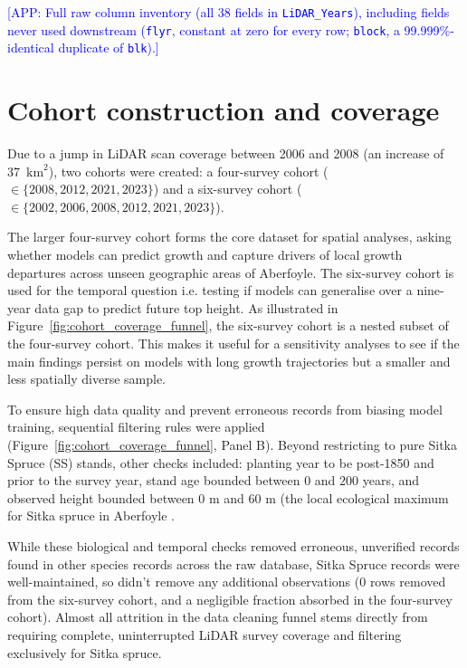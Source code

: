 \documentclass[11pt,a4paper]{report}
\newcommand{\app}[1]{\textcolor{blue}{[APP: #1]}}
\begin{document}
\app{Full raw column inventory (all 38 fields in \texttt{LiDAR\_Years}), including fields never
used downstream (\texttt{flyr}, constant at zero for every row; \texttt{block}, a
99.999\%-identical duplicate of \texttt{blk}).}


\section{Cohort construction and coverage}
\label{sec:data-cohorts}

Due to a jump in LiDAR scan coverage between 2006 and 2008 (an increase of 37~$\text{km}^2$), two cohorts were created: a four-survey cohort ($\in \{2008, 2012, 2021, 2023\}$) and a six-survey cohort ($\in \{2002, 2006, 2008, 2012, 2021, 2023\}$). 

The larger four-survey cohort forms the core dataset for spatial analyses, asking whether models can predict growth and capture drivers of local growth departures across unseen geographic areas of Aberfoyle. The six-survey cohort is used for the temporal question i.e. testing if models can generalise over a nine-year data gap to predict future top height. As illustrated in Figure~\ref{fig:cohort_coverage_funnel}, the six-survey cohort is a nested subset of the four-survey cohort. This makes it useful for a sensitivity analyses to see if the main findings persist on models with long growth trajectories but a smaller and less spatially diverse sample. 

To ensure high data quality and prevent erroneous records from biasing model training, sequential filtering rules were applied (Figure~\ref{fig:cohort_coverage_funnel}, Panel B). Beyond restricting to pure Sitka Spruce (SS) stands, other checks included: planting year to be post-1850 and prior to the survey year, stand age bounded between $0$ and $200$ years, and observed height bounded between $0\text{~m}$ and $60\text{~m}$ (the local ecological maximum for Sitka spruce in Aberfoyle \cite{mason2011Sitka_C1_SS}. 

While these biological and temporal checks removed erroneous, unverified records found in other species records across the raw database, Sitka Spruce records were well-maintained, so didn't remove any additional observations ($0$ rows removed from the six-survey cohort, and a negligible fraction absorbed in the four-survey cohort). Almost all attrition in the data cleaning funnel stems directly from requiring complete, uninterrupted LiDAR survey coverage and filtering exclusively for Sitka spruce.
\end{document}
